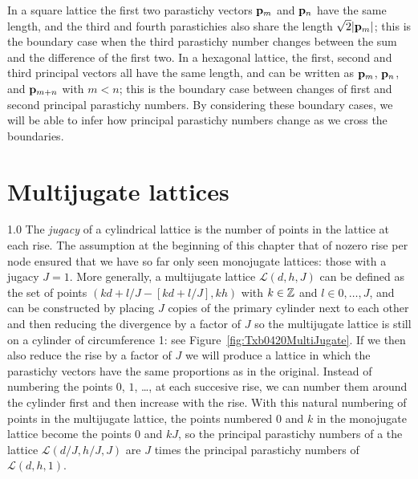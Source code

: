 In a square lattice the first two parastichy vectors ${\mathbf p}_{m}$ and ${\mathbf p}_{n}$ have the same length, and the third and fourth parastichies also share the length $\sqrt{2}|{\mathbf p}_{m}|$; this is the boundary case when the third parastichy number changes between the sum and the difference of the first two. In a hexagonal lattice, the  first,  second and third principal  vectors all have the same length, and can be written as ${\mathbf p}_{m}$, ${\mathbf p}_{n}$, and ${\mathbf p}_{m+n}$ with $m<n$; this is the boundary case between changes of first and second principal parastichy numbers. 
By considering these boundary cases, we will be able to  infer how principal parastichy numbers change as we cross the boundaries.  



 
 \section{Multijugate lattices}
{1.0}
 The \textit{jugacy} of a cylindrical lattice is the number of points in the lattice at each rise. The assumption at the beginning of this chapter that of nozero rise per node ensured that we  have so far only seen  monojugate lattices: those with a jugacy $J=1$. More generally, a multijugate lattice $\mathcal{L}(d,h,J)$ can be defined as the set of points 
 $ (kd+ l/J - [kd+ l/J],kh)$ with $ k\in\mathbb{Z}$ and $l\in  0,\ldots,J$,
 and can be constructed by placing $J$ copies of the primary cylinder next to each other and then reducing the divergence by a factor of $J$ so the multijugate lattice is still on a cylinder of circumference 1: see Figure~\ref{fig:Txb0420MultiJugate}. If we then also reduce the rise by a factor of $J$ we will produce a lattice in which the parastichy vectors have the same proportions  as in the original. Instead of numbering the points $0$, $1$, \ldots, at each succesive rise, we can number them around the cylinder first and then increase with the rise. 
 With this natural numbering of points in the multijugate lattice, the points numbered $0$ and $k$ in the monojugate lattice become the points $0$ and $kJ$, so the principal parastichy numbers of a the lattice $\mathcal{L}(d/J,h/J,J)$ are $J$ times the principal parastichy numbers of $\mathcal{L}(d,h,1)$. 
% 
